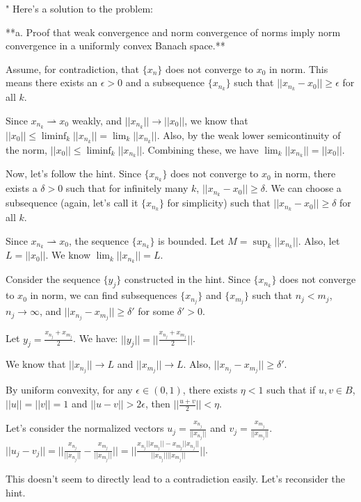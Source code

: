 "
Here's a solution to the problem:

**a. Proof that weak convergence and norm convergence of norms imply norm convergence in a uniformly convex Banach space.**

Assume, for contradiction, that $\{x_n\}$ does not converge to $x_0$ in norm. This means there exists an $\epsilon > 0$ and a subsequence $\{x_{n_k}\}$ such that $||x_{n_k} - x_0|| \ge \epsilon$ for all $k$.

Since $x_{n_k} \rightharpoonup x_0$ weakly, and $||x_{n_k}|| \to ||x_0||$, we know that $||x_0|| \le \liminf_k ||x_{n_k}|| = \lim_k ||x_{n_k}||$.  Also, by the weak lower semicontinuity of the norm, $||x_0|| \le \liminf_k ||x_{n_k}||$. Combining these, we have $\lim_k ||x_{n_k}|| = ||x_0||$.

Now, let's follow the hint. Since $\{x_{n_k}\}$ does not converge to $x_0$ in norm, there exists a $\delta > 0$ such that for infinitely many $k$, $||x_{n_k} - x_0|| \ge \delta$. We can choose a subsequence (again, let's call it $\{x_{n_k}\}$ for simplicity) such that $||x_{n_k} - x_0|| \ge \delta$ for all $k$.

Since $x_{n_k} \rightharpoonup x_0$, the sequence $\{x_{n_k}\}$ is bounded. Let $M = \sup_k ||x_{n_k}||$. Also, let $L = ||x_0||$. We know $\lim_k ||x_{n_k}|| = L$.

Consider the sequence $\{y_j\}$ constructed in the hint. Since $\{x_{n_k}\}$ does not converge to $x_0$ in norm, we can find subsequences $\{x_{n_j}\}$ and $\{x_{m_j}\}$ such that $n_j < m_j$, $n_j \to \infty$, and $||x_{n_j} - x_{m_j}|| \ge \delta'$ for some $\delta' > 0$.

Let $y_j = \frac{x_{n_j} + x_{m_j}}{2}$. We have:
$||y_j|| = ||\frac{x_{n_j} + x_{m_j}}{2}||$.

We know that $||x_{n_j}|| \to L$ and $||x_{m_j}|| \to L$. Also, $||x_{n_j} - x_{m_j}|| \ge \delta'$.

By uniform convexity, for any $\epsilon \in (0, 1)$, there exists $\eta < 1$ such that if $u, v \in B$, $||u|| = ||v|| = 1$ and $||u - v|| > 2\epsilon$, then $||\frac{u + v}{2}|| < \eta$.

Let's consider the normalized vectors $u_j = \frac{x_{n_j}}{||x_{n_j}||}$ and $v_j = \frac{x_{m_j}}{||x_{m_j}||}$.
$||u_j - v_j|| = ||\frac{x_{n_j}}{||x_{n_j}||} - \frac{x_{m_j}}{||x_{m_j}||}|| = ||\frac{x_{n_j}||x_{m_j}|| - x_{m_j}||x_{n_j}||}{||x_{n_j}|| ||x_{m_j}||}||$.

This doesn't seem to directly lead to a contradiction easily. Let's reconsider the hint.

